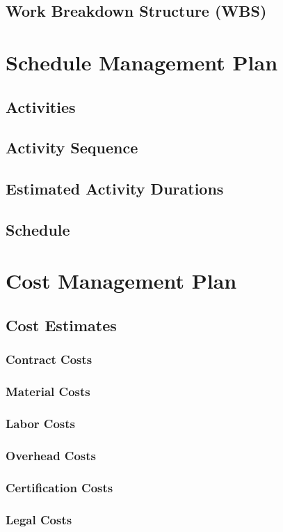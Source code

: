 \documentclass[12pt,letterpaper]{report}
\begin{document}
	\section{Work Breakdown Structure (WBS)}
	\chapter{Schedule Management Plan}
	\section{Activities}
	\section{Activity Sequence}
	\section{Estimated Activity Durations}
	\section{Schedule}

	\chapter{Cost Management Plan}
	\section{Cost Estimates}
	\subsection{Contract Costs}
	\subsection{Material Costs}
	\subsection{Labor Costs}
	\subsection{Overhead Costs}
	\subsection{Certification Costs}
	\subsection{Legal Costs}
\end{document}
